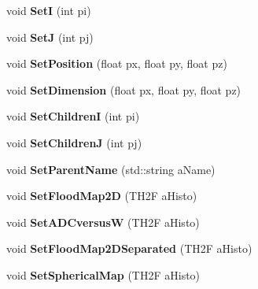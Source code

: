 \begin{DoxyCompactItemize}
\item 
\hypertarget{classElement_a326a0b4c9e0c9ffabd143587f8a41b3b}{void {\bfseries Set\+I} (int pi)}\label{classElement_a326a0b4c9e0c9ffabd143587f8a41b3b}

\item 
\hypertarget{classElement_ab7c7f57f6089a3a9e2b1123627a8d7bc}{void {\bfseries Set\+J} (int pj)}\label{classElement_ab7c7f57f6089a3a9e2b1123627a8d7bc}

\item 
\hypertarget{classElement_a39ff32a2cc85f79498d9346df5e8d70c}{void {\bfseries Set\+Position} (float px, float py, float pz)}\label{classElement_a39ff32a2cc85f79498d9346df5e8d70c}

\item 
\hypertarget{classElement_a755ef6c37fe68010d51615218b3c2e52}{void {\bfseries Set\+Dimension} (float px, float py, float pz)}\label{classElement_a755ef6c37fe68010d51615218b3c2e52}

\item 
\hypertarget{classElement_a907a8df082b331f560d4be0ea5e97576}{void {\bfseries Set\+Children\+I} (int pi)}\label{classElement_a907a8df082b331f560d4be0ea5e97576}

\item 
\hypertarget{classElement_a7e75b4ef17047487124c3df65e460b18}{void {\bfseries Set\+Children\+J} (int pj)}\label{classElement_a7e75b4ef17047487124c3df65e460b18}

\item 
\hypertarget{classElement_a35030032beef99b7eb1181022cc55b1a}{void {\bfseries Set\+Parent\+Name} (std\+::string a\+Name)}\label{classElement_a35030032beef99b7eb1181022cc55b1a}

\item 
\hypertarget{classElement_a8c690d49d503ef39b0d8ae8eb553fb93}{void {\bfseries Set\+Flood\+Map2\+D} (T\+H2\+F a\+Histo)}\label{classElement_a8c690d49d503ef39b0d8ae8eb553fb93}

\item 
\hypertarget{classElement_a52e5e8e7a1f4c0396d3d5c7d7503ba16}{void {\bfseries Set\+A\+D\+Cversus\+W} (T\+H2\+F a\+Histo)}\label{classElement_a52e5e8e7a1f4c0396d3d5c7d7503ba16}

\item 
\hypertarget{classElement_a9744147b64996c8dd2211bc821effc93}{void {\bfseries Set\+Flood\+Map2\+D\+Separated} (T\+H2\+F a\+Histo)}\label{classElement_a9744147b64996c8dd2211bc821effc93}

\item 
\hypertarget{classElement_a407ed6b0127ab9313b95a1489fdf7a42}{void {\bfseries Set\+Spherical\+Map} (T\+H2\+F a\+Histo)}\label{classElement_a407ed6b0127ab9313b95a1489fdf7a42}


\end{DoxyCompactItemize}
